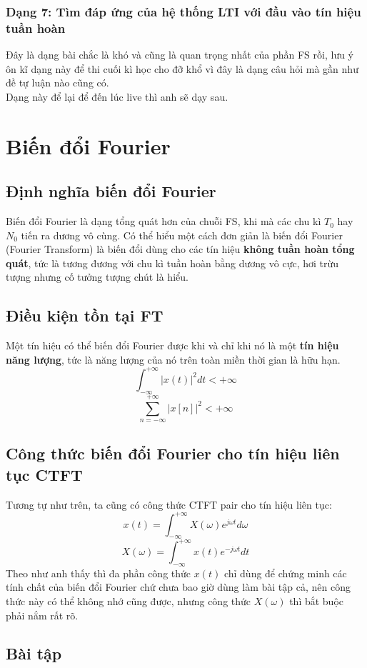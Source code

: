 \documentclass{article}
\begin{document}
\subsubsection{Dạng 7: Tìm đáp ứng của hệ thống LTI với đầu vào tín hiệu tuần hoàn}
Đây là dạng bài chắc là khó và cũng là quan trọng nhất của phần FS rồi, lưu ý ôn kĩ dạng này để thi cuối kì học cho đỡ khổ vì đây là dạng câu hỏi mà gần như đề tự luận nào cũng có.
\\ Dạng này để lại để đến lúc live thì anh sẽ dạy sau.
\section{Biến đổi Fourier}
\subsection{Định nghĩa biến đổi Fourier}
Biến đổi Fourier là dạng tổng quát hơn của chuỗi FS, khi mà các chu kì $T_{0}$ hay $N_{0}$ tiến ra dương vô cùng. Có thể hiểu một cách đơn giản là biến đổi Fourier (Fourier Transform) là biến đổi dùng cho
các tín hiệu \textbf{không tuần hoàn tổng quát}, tức là tương đương với chu kì tuần hoàn bằng dương vô cực, hơi trừu tượng nhưng cố tưởng tượng chút là hiểu.
\subsection{Điều kiện tồn tại FT}
Một tín hiệu có thể biến đổi Fourier được khi và chỉ khi nó là một \textbf{tín hiệu năng lượng}, tức là năng lượng của nó trên toàn miền thời gian là hữu hạn.
$$\int_{-\infty}^{+\infty}|x(t)|^2dt < + \infty$$
$$\sum_{n=-\infty}^{+\infty}|x[n]|^2 < + \infty$$
\subsection{Công thức biến đổi Fourier cho tín hiệu liên tục CTFT}
Tương tự như trên, ta cũng có công thức CTFT pair cho tín hiệu liên tục:
$$x(t)=\int_{-\infty}^{+\infty}X(\omega)e^{j\omega t}d\omega$$
$$X(\omega)=\int_{-\infty}^{+\infty}x(t)e^{-j\omega t}dt$$
Theo như anh thấy thì đa phần công thức $x(t)$ chỉ dùng để chứng minh các tính chất của biến đổi Fourier chứ chưa bao giờ dùng làm bài tập cả, nên công thức này có thể không nhớ cũng được, nhưng công thức $X(\omega)$ thì bắt buộc phải nắm rất rõ.
\subsection{Bài tập}
\end{document}
